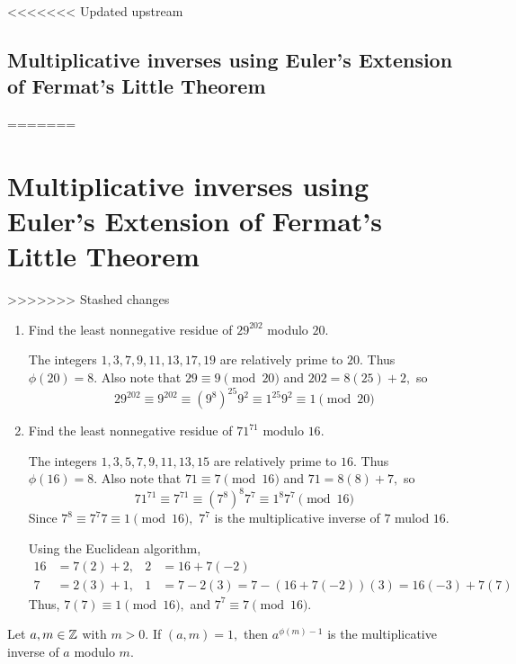\documentclass{ximera}
\begin{document}

<<<<<<< Updated upstream
\subsection*{Multiplicative inverses using Euler's Extension of Fermat's Little Theorem}
=======
\section{Multiplicative inverses using Euler's Extension of Fermat's Little Theorem}
>>>>>>> Stashed changes

\begin{example}\label{ex-euler-solve-cong}
 
  \begin{enumerate}
    \item Find the least nonnegative residue of $29^{202}$ modulo $20$. 
    
    The integers $1,3,7,9,11,13,17,19$ are relatively prime to $20.$ Thus $\phi(20)=8.$ Also note that $29\equiv 9\pmod{20}$ and $202=8(25)+2,$ so 
    \[29^{202}\equiv 9^{202}\equiv(9^8)^{25} 9^2\equiv 1^{25} 9^2\equiv 1\pmod{20}\] 
    
    \item Find the least nonnegative residue of $71^{71}$ modulo $16$.
    
    The integers $1,3,5,7,9,11,13,15$ are relatively prime to $16.$ Thus $\phi(16)=8.$ Also note that $71\equiv 7\pmod{16}$ and $71=8(8)+7,$ so 
      \[71^{71}\equiv 7^{71}\equiv(7^8)^{8} 7^7\equiv 1^{8} 7^7\pmod{16}\] 
      Since $7^8\equiv 7^7 7\equiv 1\pmod{16},$ $7^7$ is the multiplicative inverse of $7$ mulod $16.$

    Using the Euclidean algorithm, 
    \begin{align*}
      16	& = 7(2) + 2,	&2&=16+7(-2)\\
      7	& = 2(3) + 1,	&1&=7-2(3)=7-(16+7(-2))(3)=16(-3)+7(7)
    \end{align*}
    Thus, $7(7)\equiv 1\pmod{16},$ and $7^7\equiv 7\pmod{16}.$
  \end{enumerate}
\end{example}

\begin{corollary}\label{cor:inv-euler}
  Let $a,m\in\mathbb Z$ with $m>0.$  If $(a,m)=1,$ then $a^{\phi(m)-1}$ is the multiplicative inverse of $a$ modulo $m$.
\end{corollary}
\end{document}
